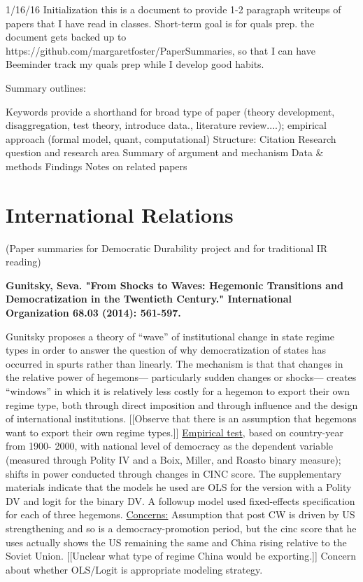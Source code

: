\documentclass{article}[12pt]
\begin{document}
1/16/16 Initialization
this is a document to provide 1-2 paragraph writeups of papers that I have read in classes. Short-term goal is for quals prep.
the document gets backed up to https://github.com/margaretfoster/PaperSummaries, so that I can have Beeminder track my quals prep 
while I develop good habits.

Summary outlines:

Keywords provide a shorthand for broad type of paper (theory development, disaggregation, test theory, introduce data., literature review....); empirical approach (formal model, quant, computational)
Structure:
Citation
Research question and research area
Summary of argument and mechanism
Data \& methods
Findings
Notes on related papers

\section{International Relations}
(Paper summaries for Democratic Durability project and for traditional IR reading)


\textbf{Gunitsky, Seva. "From Shocks to Waves: Hegemonic Transitions and Democratization in the Twentieth Century." International Organization 68.03 (2014): 561-597.}

Gunitsky proposes a theory of “wave” of institutional change in state regime types in order to answer the question of why democratization of states has occurred in spurts rather than linearly. The mechanism is that that changes in the relative power of hegemons— particularly sudden changes or shocks— creates “windows” in which it is relatively less costly for a hegemon to export their own regime type, both through direct imposition and through influence and the design of international institutions. [[Observe that there is an assumption that hegemons want to export their own regime types.]]
\underline{Empirical test}, based on country-year from 1900- 2000, with national level of democracy as the dependent variable (measured through Polity IV and a Boix, Miller, and Roasto binary measure); shifts in power conducted through changes in CINC score. The supplementary materials indicate that the models he used are OLS for the version with a Polity DV and logit for the binary DV.  A followup model used fixed-effects specification for each of three hegemons.
\underline{Concerns:} Assumption that post CW is driven by US strengthening and so is a democracy-promotion period, but the cinc score that he uses actually shows the US remaining the same and China rising relative to the Soviet Union. [[Unclear what type of regime China would be exporting.]] Concern about whether OLS/Logit is appropriate modeling strategy.
\end{document}
